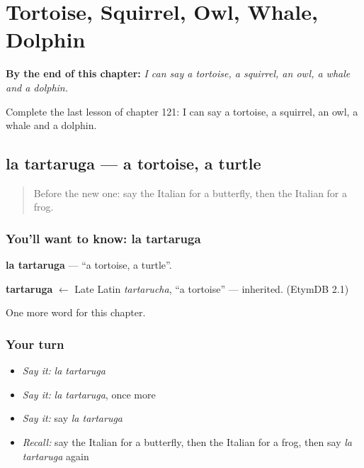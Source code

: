 
\chapter{Tortoise, Squirrel, Owl, Whale, Dolphin}
\label{ch:it-tortoise-squirrel-owl-whale-dolphin}

\begin{chapteropening}
\textbf{By the end of this chapter:} \emph{I can say a tortoise, a squirrel, an owl, a whale and a dolphin.}

Complete the last lesson of chapter 121: I can say a tortoise, a squirrel, an owl, a whale and a dolphin.
\end{chapteropening}

\section[la tartaruga]{la tartaruga — a tortoise, a turtle}

\label{lesson:IT-C121-tartaruga}



\begin{quote}
Before the new one: say the Italian for a butterfly, then the Italian for a frog.
\end{quote}

\subsection*{You'll want to know: la tartaruga}
\textbf{la tartaruga} — \textquotedblleft{}a tortoise, a turtle\textquotedblright{}.

\begin{cousinweb}
\textbf{tartaruga} $\leftarrow$ Late Latin \emph{tartarucha}, \textquotedblleft{}a tortoise\textquotedblright{} — inherited. (EtymDB 2.1)
\end{cousinweb}

\begin{grammarlens}[title={What you've built}]
One more word for this chapter.
\end{grammarlens}

\subsection*{Your turn}
\begin{itemize}
\raggedright
  \item \emph{Say it:} \emph{la tartaruga}
  \item \emph{Say it:} \emph{la tartaruga}, once more
  \item \emph{Say it:} say \emph{la tartaruga}
  \item \emph{Recall:} say the Italian for a butterfly, then the Italian for a frog, then say \emph{la tartaruga} again
\end{itemize}

